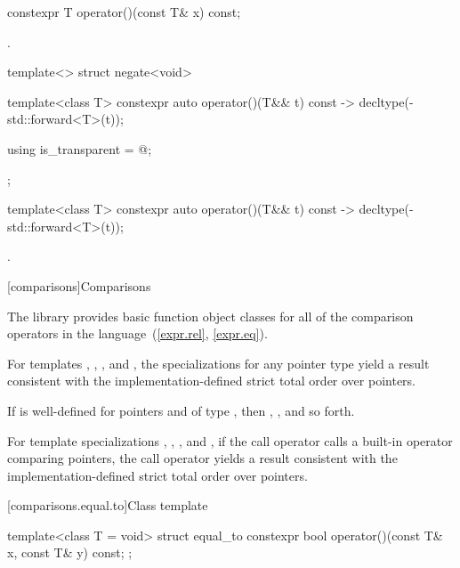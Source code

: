 %
\begin{itemdecl}
constexpr T operator()(const T& x) const;
\end{itemdecl}

\begin{itemdescr}
\pnum
\returns
{}.
\end{itemdescr}

%
\begin{itemdecl}
template<> struct negate<void> {
  template<class T> constexpr auto operator()(T&& t) const
    -> decltype(-std::forward<T>(t));

  using is_transparent = @\unspec@;
};
\end{itemdecl}

%
\begin{itemdecl}
template<class T> constexpr auto operator()(T&& t) const
    -> decltype(-std::forward<T>(t));
\end{itemdecl}

\begin{itemdescr}
\pnum
\returns
{}.
\end{itemdescr}


[comparisons]{Comparisons}

\pnum
The library provides basic function object classes for all of the comparison
operators in the language~(\ref{expr.rel}, \ref{expr.eq}).

\pnum
For templates , , , and
, the specializations for any pointer type
yield a result consistent with the
implementation-defined strict total order over pointers.
\begin{note}
If  is well-defined
for pointers  and  of type ,
then ,
, and so forth.
\end{note}
For template specializations , ,
, and ,
if the call operator calls a built-in operator comparing pointers,
the call operator yields a result consistent
with the implementation-defined strict total order over pointers.

[comparisons.equal.to]{Class template }

\begin{indexed}{
%
}
\begin{itemdecl}
template<class T = void> struct equal_to {
  constexpr bool operator()(const T& x, const T& y) const;
};
\end{itemdecl}
\end{indexed}

